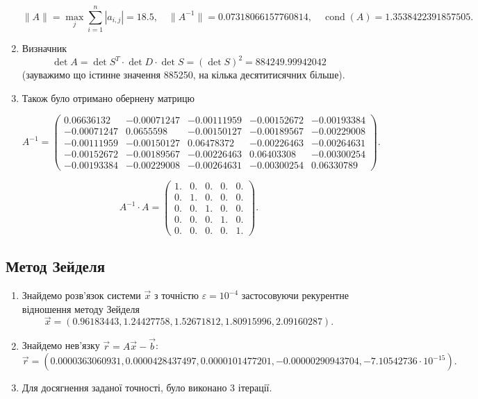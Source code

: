 \documentclass[12pt, a4paper]{article}
\theoremstyle{definition}
\newcommand{\Max}{\displaystyle\max\limits}
\newcommand{\Sum}{\displaystyle\sum\limits}
\renewcommand{\epsilon}{\varepsilon}
\DeclareMathOperator{\cond}{cond}
\numberwithin{equation}{section}
\begin{document}
\begin{enumerate}
\[ \|A\| = \Max_j \Sum_{i=1}^n |a_{i,j}| = 18.5, \quad \|A^{-1}\| = 0.07318066157760814, \quad \cond(A) = 1.3538422391857505. \]

\item Визначник \[ \det A = \det S^T \cdot \det D \cdot \det S = (\det S)^2 = 884249.99942042 \] (зауважимо що істинне значення 885250, на кілька десятитисячних більше). \\

\item Також було отримано обернену матрицю

\[ A^{-1} = \begin{pmatrix} 0.06636132 & -0.00071247 & -0.00111959 & -0.00152672 & -0.00193384 \\ -0.00071247 & 0.0655598 & -0.00150127 & -0.00189567 & -0.00229008 \\ -0.00111959 & -0.00150127 & 0.06478372 & -0.00226463 & -0.00264631 \\ -0.00152672 & -0.00189567 & -0.00226463 & 0.06403308 & -0.00300254 \\ -0.00193384 & -0.00229008 & -0.00264631 & -0.00300254 & 0.06330789 \end{pmatrix}. \]

\[ A^{-1} \cdot A = \begin{pmatrix} 1. & 0. & 0. & 0. & 0. \\ 0. & 1. & 0. & 0. & 0. \\ 0. & 0. & 1. & 0. & 0. \\ 0. & 0. & 0. & 1. & 0. \\ 0. & 0. & 0. & 0. & 1. \end{pmatrix}. \]
\end{enumerate}

\subsection{Метод Зейделя}

\begin{enumerate}
\item Знайдемо розв'язок системи $\vec x$ з точністю $\epsilon = 10^{-4}$ застосовуючи рекурентне відношення методу Зейделя \[ \vec x = (0.96183443, 1.24427758, 1.52671812, 1.80915996, 2.09160287). \]

\item Знайдемо нев'язку $\vec r = A \vec x - \vec b$: \[ \vec r = (0.0000363060931, 0.0000428437497, 0.0000101477201, -0.00000290943704, -7.10542736\cdot10^{-15}). \]

\item Для досягнення заданої точності, було виконано 3 ітерації.
\end{enumerate}
\end{document}
